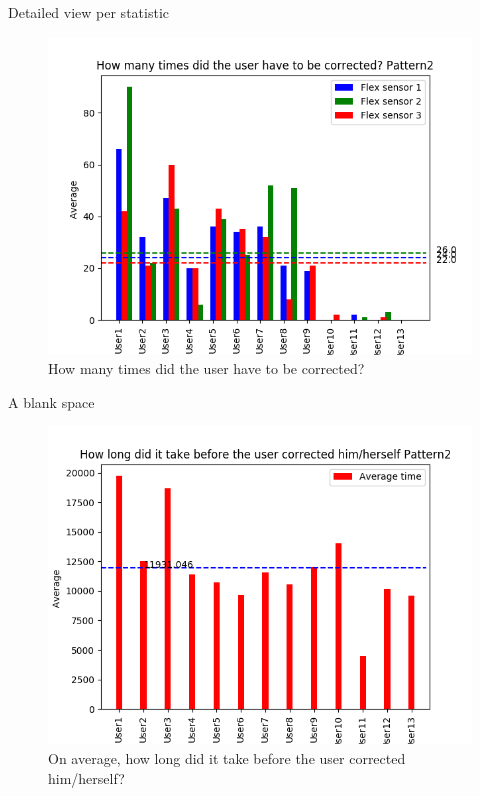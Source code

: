 \documentclass[sigconf]{acmart}
\begin{document}
Detailed view per statistic
\begin{figure}[hb]
\centering
\includegraphics[width=1\columnwidth, scale=1]{p2_q1.png}
\caption{How many times did the user have to be corrected?}
\end{figure}
{\color{white} A blank space } \linebreak

\begin{figure}[ht]
\centering
\includegraphics[width=1\columnwidth, scale=1]{p2_q2.png}
\caption{On average, how long did it take before the user corrected him/herself?}
\end{figure}
\end{document}
